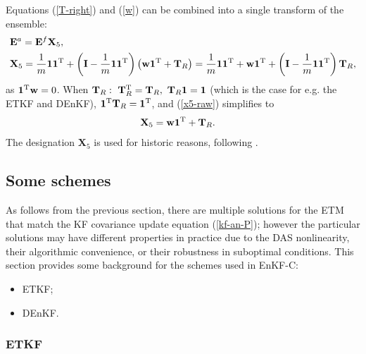 \documentclass[11pt]{report}
\newcommand{\mb} {\mathbf}
\newcommand{\T}{^{\tiny \mathrm T}}
\begin{document}
Equations (\ref{T-right}) and (\ref{w}) can be combined into a single transform of the ensemble:
\begin{align}
  \label{x5-def}
  & \mb E^a = \mb E^f \mb X_5,\\
  \label{x5-raw}
  & \mb X_5 = \frac{1}{m} \mb 1 \mb 1\T + \left( \mb I - \frac{1}{m} \mb 1 \mb 1\T\right) \left( \mb w \mb 1\T + \mb T_R\right)
  = \frac{1}{m} \mb 1 \mb 1\T + \mb w \mb 1\T + \left( \mb I - \frac{1}{m} \mb 1 \mb 1\T \right) \mb T_R,
\end{align}
as $\mb 1\T \mb w = 0$. 
When $\mb T_R:\ \mb T_R\T = \mb T_R,\ \mb T_R \mb 1 = \mb 1$ (which is the case for e.g. the ETKF and DEnKF), $\mb 1\T \mb T_R = \mb 1\T$, and (\ref{x5-raw}) simplifies to
\begin{align}
  \label{x5}
  & \mb X_5 = \mb w \mb 1\T + \mb T_R.
\end{align}
The designation $\mb X_5$ is used for historic reasons, following \citet{eve03a}.

\subsection{Some schemes}

As follows from the previous section, there are multiple solutions for the ETM that match the KF covariance update equation (\ref{kf-an-P}); however the particular solutions may have different properties in practice due to the DAS nonlinearity, their algorithmic convenience, or their robustness in suboptimal conditions.
This section provides some background for the schemes used in EnKF-C:
\begin{itemize}
\item ETKF;
\item DEnKF.
\end{itemize}

\subsubsection{ETKF}
\end{document}
